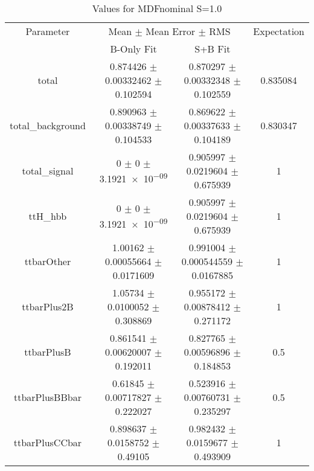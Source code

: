 \begin{table}
\centering
\caption{Values for MDFnominal S=1.0}
\begin{tabular}{cccc}
\toprule
Parameter & \multicolumn{2}{c}{Mean $\pm$ Mean Error $\pm$ RMS} & Expectation\\
 & B-Only Fit & S+B Fit & \\
\midrule
total & \num{0.874426} $\pm$ \num{0.00332462} $\pm$ \num{0.102594} & \num{0.870297} $\pm$ \num{0.00332348} $\pm$ \num{0.102559} & \num{0.835084}\\
total\_background & \num{0.890963} $\pm$ \num{0.00338749} $\pm$ \num{0.104533} & \num{0.869622} $\pm$ \num{0.00337633} $\pm$ \num{0.104189} & \num{0.830347}\\
total\_signal & \num{0} $\pm$ \num{0} $\pm$ \num{3.1921e-09} & \num{0.905997} $\pm$ \num{0.0219604} $\pm$ \num{0.675939} & \num{1}\\
ttH\_hbb & \num{0} $\pm$ \num{0} $\pm$ \num{3.1921e-09} & \num{0.905997} $\pm$ \num{0.0219604} $\pm$ \num{0.675939} & \num{1}\\
ttbarOther & \num{1.00162} $\pm$ \num{0.00055664} $\pm$ \num{0.0171609} & \num{0.991004} $\pm$ \num{0.000544559} $\pm$ \num{0.0167885} & \num{1}\\
ttbarPlus2B & \num{1.05734} $\pm$ \num{0.0100052} $\pm$ \num{0.308869} & \num{0.955172} $\pm$ \num{0.00878412} $\pm$ \num{0.271172} & \num{1}\\
ttbarPlusB & \num{0.861541} $\pm$ \num{0.00620007} $\pm$ \num{0.192011} & \num{0.827765} $\pm$ \num{0.00596896} $\pm$ \num{0.184853} & \num{0.5}\\
ttbarPlusBBbar & \num{0.61845} $\pm$ \num{0.00717827} $\pm$ \num{0.222027} & \num{0.523916} $\pm$ \num{0.00760731} $\pm$ \num{0.235297} & \num{0.5}\\
ttbarPlusCCbar & \num{0.898637} $\pm$ \num{0.0158752} $\pm$ \num{0.49105} & \num{0.982432} $\pm$ \num{0.0159677} $\pm$ \num{0.493909} & \num{1}\\
\bottomrule
\end{tabular}
\end{table}